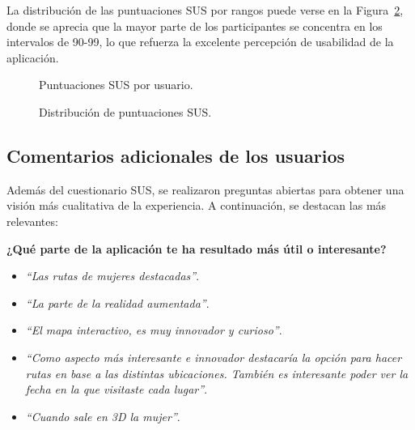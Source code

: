 La distribución de las puntuaciones SUS por rangos puede verse en la Figura~\ref{fig:sus-distribucion}, donde se aprecia que la mayor parte de los participantes se concentra en los intervalos de 90-99, lo que refuerza la excelente percepción de usabilidad de la aplicación.

\begin{figure}[H]
\centering
{}
\caption{Puntuaciones SUS por usuario.}
\label{fig:sus-usuarios}
\end{figure}

\begin{figure}[H]
\centering
{}
\caption{Distribución de puntuaciones SUS.}
\label{fig:sus-distribucion}
\end{figure}

\subsection{Comentarios adicionales de los usuarios}
Además del cuestionario SUS, se realizaron preguntas abiertas para obtener una visión más cualitativa de la experiencia. A continuación, se destacan las más relevantes:

\textbf{¿Qué parte de la aplicación te ha resultado más útil o interesante?}
\begin{itemize}
    \item \textit{“Las rutas de mujeres destacadas”}.
    \item \textit{“La parte de la realidad aumentada”}.
    \item \textit{“El mapa interactivo, es muy innovador y curioso”}.
    \item \textit{“Como aspecto más interesante e innovador destacaría la opción para hacer rutas en base a las distintas ubicaciones. También es interesante poder ver la fecha en la que visitaste cada lugar”}.
    \item \textit{“Cuando sale en 3D la mujer”}.
\end{itemize}

